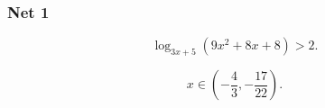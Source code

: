 \subsubsection{Net 1}
 
\zadatak
$$
\log_{3x+5}(9x^2+8x+8)>2.
$$

\resenje
$$
x \in \left( -\frac43, -\frac{17}{22} \right).
$$